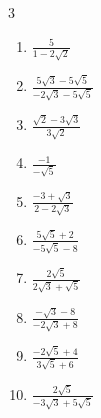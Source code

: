 \begin{multicols}{3}
\begin{enumerate}
\columnbreak %

  \item $\displaystyle \frac{5}{1-2\sqrt{2}}$


  \item $\displaystyle \frac{5\sqrt{3}-5\sqrt{5}}{-2\sqrt{3}-5\sqrt{5}}$


  \item $\displaystyle \frac{\sqrt{2}-3\sqrt{3}}{3\sqrt{2}}$


  \item $\displaystyle \frac{-1}{-\sqrt{5}}$


  \item $\displaystyle \frac{-3+\sqrt{3}}{2-2\sqrt{3}}$


\columnbreak %

  \item $\displaystyle \frac{5\sqrt{5}+2}{-5\sqrt{5}-8}$


  \item $\displaystyle \frac{2\sqrt{5}}{2\sqrt{3}+\sqrt{5}}$


  \item $\displaystyle \frac{-\sqrt{3}-8}{-2\sqrt{3}+8}$


  \item $\displaystyle \frac{-2\sqrt{5}+4}{3\sqrt{5}+6}$


  \item $\displaystyle \frac{2\sqrt{5}}{-3\sqrt{3}+5\sqrt{5}}$


\columnbreak %

\resetques


\end{enumerate}
\end{multicols}
